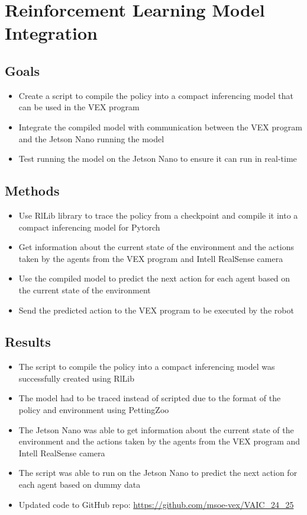 \section{Reinforcement Learning Model Integration}

\subsection{Goals}
\begin{itemize}
    \item Create a script to compile the policy into a compact inferencing model that can be used in the VEX program
    \item Integrate the compiled model with communication between the VEX program and the Jetson Nano running the model
    \item Test running the model on the Jetson Nano to ensure it can run in real-time
\end{itemize}

\subsection{Methods}
\begin{itemize}
    \item Use RlLib library to trace the policy from a checkpoint and compile it into a compact inferencing model for Pytorch
    \item Get information about the current state of the environment and the actions taken by the agents from the VEX program and Intell RealSense camera
    \item Use the compiled model to predict the next action for each agent based on the current state of the environment
    \item Send the predicted action to the VEX program to be executed by the robot
\end{itemize}

\subsection{Results}
\begin{itemize}
    \item The script to compile the policy into a compact inferencing model was successfully created using RlLib
    \item The model had to be traced instead of scripted due to the format of the policy and environment using PettingZoo
    \item The Jetson Nano was able to get information about the current state of the environment and the actions taken by the agents from the VEX program and Intell RealSense camera
    \item The script was able to run on the Jetson Nano to predict the next action for each agent based on dummy data
    \item Updated code to GitHub repo: \href{https://github.com/msoe-vex/VAIC_24_25}{https://github.com/msoe-vex/VAIC_24_25}
\end{itemize}

